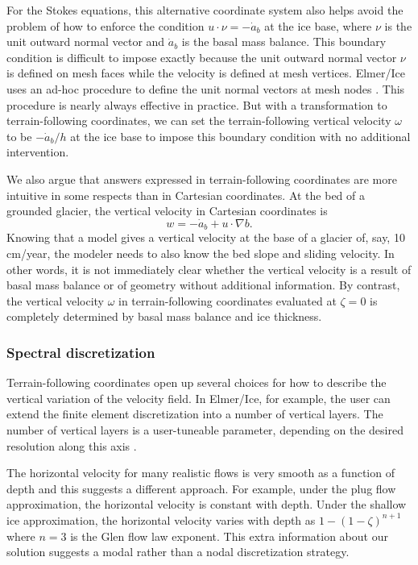 \documentclass{article}
\theoremstyle{definition}
\theoremstyle{plain}
\begin{document}
For the Stokes equations, this alternative coordinate system also helps avoid the problem of how to enforce the condition $u\cdot \nu = -\dot a_b$ at the ice base, where $\nu$ is the unit outward normal vector and $\dot a_b$ is the basal mass balance.
This boundary condition is difficult to impose exactly because the unit outward normal vector $\nu$ is defined on mesh faces while the velocity is defined at mesh vertices.
Elmer/Ice uses an ad-hoc procedure to define the unit normal vectors at mesh nodes \citep{gagliardini2013capabilities}.
This procedure is nearly always effective in practice.
But with a transformation to terrain-following coordinates, we can set the terrain-following vertical velocity $\omega$ to be $-\dot a_b/h$ at the ice base to impose this boundary condition with no additional intervention.

We also argue that answers expressed in terrain-following coordinates are more intuitive in some respects than in Cartesian coordinates.
At the bed of a grounded glacier, the vertical velocity in Cartesian coordinates is
\begin{equation}
    w = -\dot a_b + u\cdot\nabla b.
\end{equation}
Knowing that a model gives a vertical velocity at the base of a glacier of, say, 10 cm/year, the modeler needs to also know the bed slope and sliding velocity.
In other words, it is not immediately clear whether the vertical velocity is a result of basal mass balance or of geometry without additional information.
By contrast, the vertical velocity $\omega$ in terrain-following coordinates evaluated at $\zeta = 0$ is completely determined by basal mass balance and ice thickness.


\subsubsection{Spectral discretization}

Terrain-following coordinates open up several choices for how to describe the vertical variation of the velocity field.
In Elmer/Ice, for example, the user can extend the finite element discretization into a number of vertical layers.
The number of vertical layers is a user-tuneable parameter, depending on the desired resolution along this axis \citep{gagliardini2013capabilities}.

The horizontal velocity for many realistic flows is very smooth as a function of depth and this suggests a different approach.
For example, under the plug flow approximation, the horizontal velocity is constant with depth.
Under the shallow ice approximation, the horizontal velocity varies with depth as $1 - (1 - \zeta)^{n + 1}$ where $n = 3$ is the Glen flow law exponent.
This extra information about our solution suggests a modal rather than a nodal discretization strategy.
\end{document}
